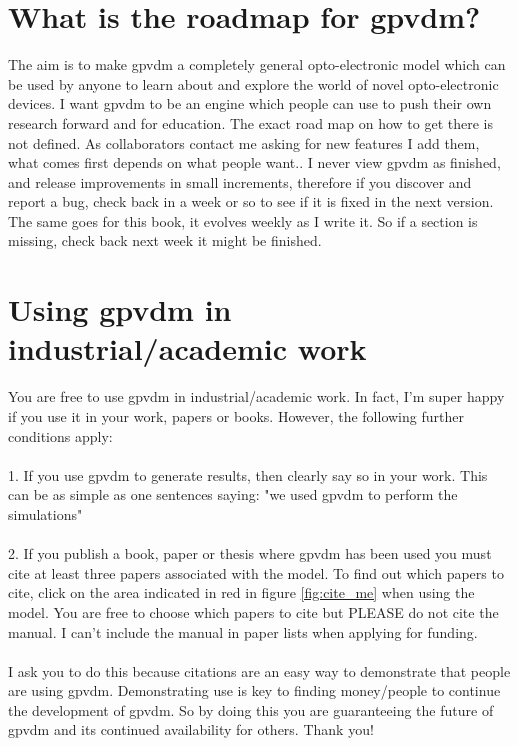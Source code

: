 \section{What is the roadmap for gpvdm?}
The aim is to make gpvdm a completely general opto-electronic model which can be used by anyone to learn about and explore the world of novel opto-electronic devices.  I want gpvdm to be an engine which people can use to push their own research forward and for education. The exact road map on how to get there is not defined.  As collaborators contact me asking for new features I add them, what comes first depends on what people want.. I never view gpvdm as finished, and release improvements in small increments, therefore if you discover and report a bug, check back in a week or so to see if it is fixed in the next version.  The same goes for this book, it evolves weekly as I write it. So if a section is missing, check back next week it might be finished.

\section{Using gpvdm in industrial/academic work}
\label{sec:using_gvpdm}
You are free to use gpvdm in industrial/academic work. In fact, I'm super happy if you use it in your work, papers or books. However, the following further conditions apply:\\\\
1. If you use gpvdm to generate results, then clearly say so in your work. This can be as simple as one sentences saying: "we used gpvdm to perform the simulations" \\\\
2. If you publish a book, paper or thesis where gpvdm has been used you must cite at least three papers associated with the model.  To find out which papers to cite, click on the area indicated in red in figure \ref{fig:cite_me} when using the model.   You are free to choose which papers to cite but PLEASE do not cite the manual. I can't include the manual in paper lists when applying for funding.\\
\\
I ask you to do this because citations are an easy way to demonstrate that people are using gpvdm. Demonstrating use is key to finding money/people to continue the development of gpvdm.  So by doing this you are guaranteeing the future of gpvdm and its continued availability for others.  Thank you!


